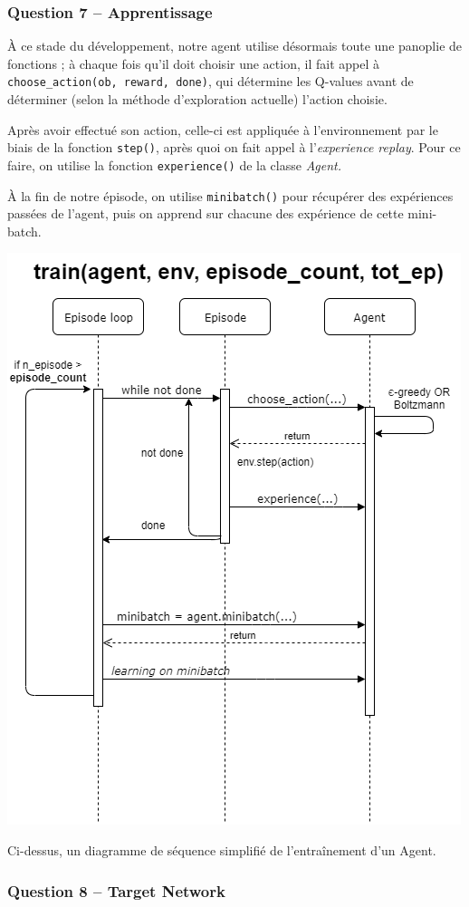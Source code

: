 \documentclass[12pt,french]{article}
\begin{document}
\subsubsection{Question 7 -- Apprentissage}

À ce stade du développement, notre agent utilise désormais toute une panoplie de fonctions ; à chaque fois qu'il doit choisir une action, il fait appel à \texttt{choose\_action(ob, reward, done)}, qui détermine les Q-values avant de déterminer (selon la méthode d'exploration actuelle) l'action choisie.

Après avoir effectué son action, celle-ci est appliquée à l'environnement par le biais de la fonction \texttt{step()}, après quoi on fait appel à l'\textit{experience replay}. Pour ce faire, on utilise la fonction \texttt{experience()} de la classe \textit{Agent.}

À la fin de notre épisode, on utilise \texttt{minibatch()} pour récupérer des expériences passées de l'agent, puis on apprend sur chacune des expérience de cette mini-batch.

\begin{center}
    \includegraphics[width=.7\textwidth]{../src/img/Q7.png}
\end{center}

Ci-dessus, un diagramme de séquence simplifié de l'entraînement d'un Agent.

\subsubsection{Question 8 -- Target Network}
\end{document}
